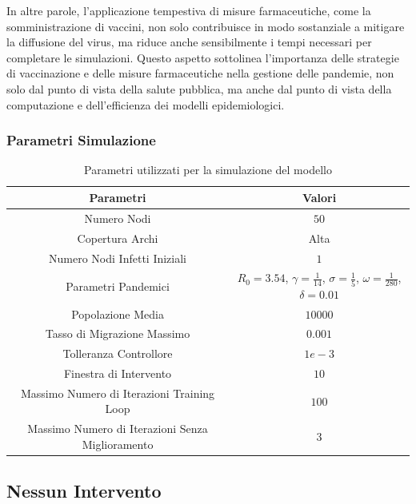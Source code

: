 In altre parole, l'applicazione tempestiva di misure farmaceutiche, 
come la somministrazione di vaccini, non solo contribuisce in modo 
sostanziale a mitigare la diffusione del virus, ma riduce anche 
sensibilmente i tempi necessari per completare le simulazioni. 
Questo aspetto sottolinea l'importanza delle strategie di vaccinazione 
e delle misure farmaceutiche nella gestione delle pandemie, 
non solo dal punto di vista della salute pubblica, ma anche dal punto 
di vista della computazione e dell'efficienza dei modelli epidemiologici.
\newpage

\subsubsection*{Parametri Simulazione}

\begin{table}[htb]
    \centering
    \caption{Parametri utilizzati per la simulazione del modello}
    \begin{tabular}{ |c||c| } 
		\hline
		\textbf{Parametri} & \textbf{Valori} \\ 
		\hline
		Numero Nodi & $50$ \\
		Copertura Archi & Alta \\
		Numero Nodi Infetti Iniziali & $1$ \\
		Parametri Pandemici & $R_0 = 3.54$, $\gamma = \frac{1}{14}$, $\sigma = \frac{1}{5}$, $\omega = \frac{1}{280}$, $\delta = 0.01$ \\
		Popolazione Media & $10000$ \\
		Tasso di Migrazione Massimo & $0.001$ \\
		Tolleranza Controllore & $1e-3$ \\
		Finestra di Intervento & $10$ \\
		Massimo Numero di Iterazioni Training Loop & $100$ \\
		Massimo Numero di Iterazioni Senza Miglioramento & $3$ \\
		\hline
		\end{tabular}
\end{table}

\subsection{Nessun Intervento}

